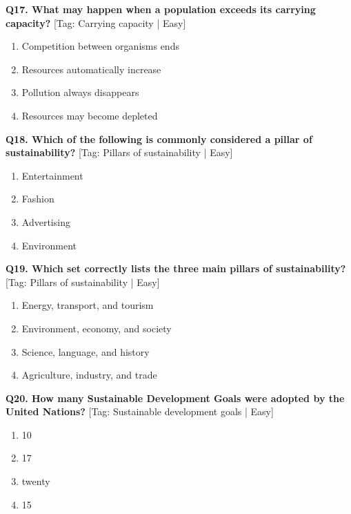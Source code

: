 \noindent\textbf{Q17. What may happen when a population exceeds its carrying capacity?} \hfill [Tag: Carrying capacity | Easy]
\begin{enumerate}[label=(\alph*),topsep=2pt,itemsep=1pt,partopsep=0pt,parsep=0pt]
    \item {Competition between organisms ends}
    \item {Resources automatically increase}
    \item {Pollution always disappears}
    \item {Resources may become depleted}
\end{enumerate}
\vspace{2mm}

\noindent\textbf{Q18. Which of the following is commonly considered a pillar of sustainability?} \hfill [Tag: Pillars of sustainability | Easy]
\begin{enumerate}[label=(\alph*),topsep=2pt,itemsep=1pt,partopsep=0pt,parsep=0pt]
    \item {Entertainment}
    \item {Fashion}
    \item {Advertising}
    \item {Environment}
\end{enumerate}
\vspace{2mm}

\noindent\textbf{Q19. Which set correctly lists the three main pillars of sustainability?} \hfill [Tag: Pillars of sustainability | Easy]
\begin{enumerate}[label=(\alph*),topsep=2pt,itemsep=1pt,partopsep=0pt,parsep=0pt]
    \item {Energy, transport, and tourism}
    \item {Environment, economy, and society}
    \item {Science, language, and history}
    \item {Agriculture, industry, and trade}
\end{enumerate}
\vspace{2mm}

\noindent\textbf{Q20. How many Sustainable Development Goals were adopted by the United Nations?} \hfill [Tag: Sustainable development goals | Easy]
\begin{enumerate}[label=(\alph*),topsep=2pt,itemsep=1pt,partopsep=0pt,parsep=0pt]
    \item {10}
    \item {17}
    \item {twenty}
    \item {15}
\end{enumerate}
\vspace{2mm}

